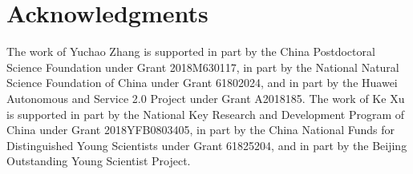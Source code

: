 \section*{Acknowledgments}
The work of Yuchao Zhang is supported in part by the China Postdoctoral Science Foundation under Grant 2018M630117, in part by the National Natural Science Foundation of China under Grant 61802024, and in part by the Huawei Autonomous and Service 2.0 Project under Grant A2018185. The work of Ke Xu is supported in part by the National Key Research and Development Program of China under Grant 2018YFB0803405, in part by the China National Funds for Distinguished Young Scientists under Grant 61825204, and in part by the Beijing Outstanding Young Scientist Project.